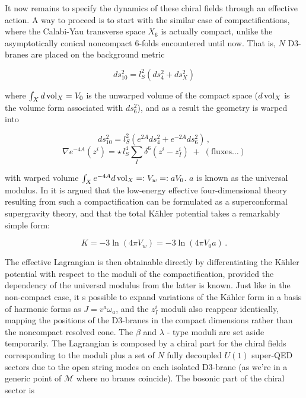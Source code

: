 It now remains to specify the dynamics of these chiral fields through an effective action. A way to proceed is to start with the similar case of compactifications\cite{MZ_2}, where the Calabi-Yau transverse space $X_6$ is actually compact, unlike the asymptotically conical noncompact 6-folds encountered until now. That is, $N$ D3-branes are placed on the background metric

\begin{equation}
	ds_{10}^2 = l_S^2 (ds^2_4 + ds^2_X)
	\label{}
\end{equation}

where $\int_X d\operatorname{vol}_X = V_0$ is the unwarped volume of the compact space ($d\operatorname{vol}_X$ is the volume form associated with $ds_6^2$), and as a result the geometry is warped into

\begin{equation}
	ds_{10}^2 = l_S^2 ( e^{2A} ds^2_4 + e^{-2A} ds^2_6 )\,,
\end{equation}
\begin{equation}
	\nabla e^{-4A}(z^i) = \star \, l_S^4 \sum_I \delta^6(z^i - z_I^i) \; + \; (\text {fluxes}\ldots)
	\label{}
\end{equation}

with warped volume $\int_X e^{-4A} d\operatorname{vol}_X =: V_w =: a V_0$. $a$ is known as the universal modulus. In \cite{MZ_2} it is argued that the low-energy effective four-dimensional theory resulting from such a compactification can be formulated as a superconformal supergravity theory, and that the total K\"ahler potential takes a remarkably simple form:

\begin{equation}
	K = -3 \ln(4\pi V_w) = -3 \ln(4 \pi V_0 a)\,.
	\label{warpedkahler}
\end{equation}

The effective Lagrangian is then obtainable directly by differentiating the K\"ahler potential with respect to the moduli of the compactification, provided the dependency of the universal modulus from the latter is known. Just like in the non-compact case, it s possible to expand variations of the K\"ahler form in a basis of harmonic forms as $J = v^a \omega_a$, and the $z_I^i$ moduli also reappear identically, mapping the positions of the D3-branes in the compact dimensions rather than the noncompact resolved cone. The $\beta$ and $\lambda$ - type moduli are set aside temporarily. The Lagrangian is composed by a chiral part for the chiral fields corresponding to the moduli plus a set of $N$ fully decoupled $U(1)$ super-QED sectors due to the open string modes on each isolated D3-brane (as we're in a generic point of $\mathcal{M}$ where no branes coincide). The bosonic part of the chiral sector is

